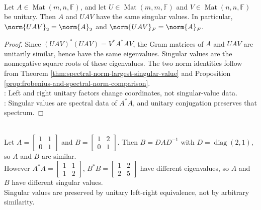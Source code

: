 \begin{proposition} \label{prop:unitary-invariance-of-singular-values} \\
Let $A\in\operatorname{Mat}(m,n,\mathbb{F})$, and let $U\in\operatorname{Mat}(m,m,\mathbb{F})$ and $V\in\operatorname{Mat}(n,n,\mathbb{F})$ be unitary. Then $A$ and $UAV$ have the same singular values. In particular, $\norm{UAV}_2=\norm{A}_2$ and $\norm{UAV}_F=\norm{A}_F$.
\begin{proof}
Since $(UAV)^*(UAV)=V^*A^*AV$, the Gram matrices of $A$ and $UAV$ are unitarily similar, hence have the same eigenvalues. Singular values are the nonnegative square roots of these eigenvalues. The two norm identities follow from Theorem \ref{thm:spectral-norm-largest-singular-value} and Proposition \ref{prop:frobenius-and-spectral-norm-comparison}.\\
: Left and right unitary factors change coordinates, not singular-value data.\\
: Singular values are spectral data of $A^*A$, and unitary conjugation preserves that spectrum.
\end{proof}
\end{proposition}

\begin{example} \label{ex:similarity-need-not-preserve-singular-values} \\
Let $A=\begin{bmatrix}1&1\\0&1\end{bmatrix}$ and $B=\begin{bmatrix}1&2\\0&1\end{bmatrix}$. Then $B=DAD^{-1}$ with $D=\operatorname{diag}(2,1)$, so $A$ and $B$ are similar.\\
However $A^*A=\begin{bmatrix}1&1\\1&2\end{bmatrix}$, $B^*B=\begin{bmatrix}1&2\\2&5\end{bmatrix}$ have different eigenvalues, so $A$ and $B$ have different singular values.\\
Singular values are preserved by unitary left-right equivalence, not by arbitrary similarity.
\end{example}


